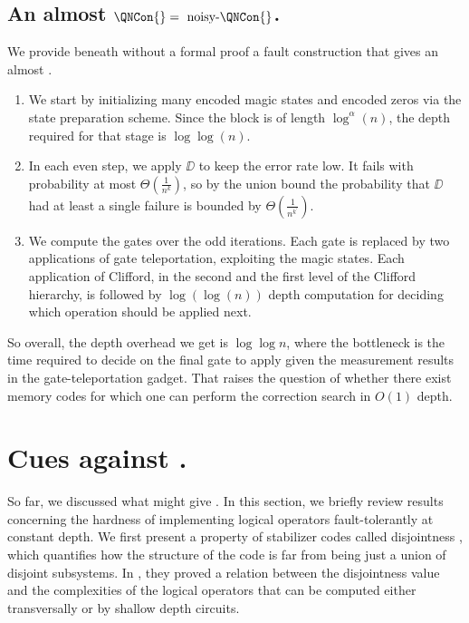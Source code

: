   \subsection{An almost $\QNCon{} = \text{ noisy-}\QNCon{} $.}
  We provide beneath without a formal proof a fault construction that gives an almost \CDO. 
  \begin{enumerate}
    \item We start by initializing many encoded magic states and encoded zeros via the state preparation scheme. Since the block is of length $\log^{\alpha}(n)$, the depth required for that stage is $\log\log(n)$.
    \item In each even step, we apply $\DD$ to keep the error rate low. It fails with probability at most $\Theta\left(\frac{1}{n^k}\right)$, so by the union bound the probability that $\DD$ had at least a single failure is bounded by $\Theta(\frac{1}{n^{k^{\prime}}})$.
    \item We compute the gates over the odd iterations. Each gate is replaced by two applications of gate teleportation, exploiting the magic states. Each application of Clifford, in the second and the first level of the Clifford hierarchy, is followed by $\log(\log (n))$ depth computation for deciding which operation should be applied next.
  \end{enumerate}
So overall, the depth overhead we get is $\log \log n$, where the bottleneck is the time required to decide on the final gate to apply given the measurement results in the gate-teleportation gadget. That raises the question of whether there exist memory codes for which one can perform the correction search in $O(1)$ depth. \cite{Gu_2024}

  \section{ Cues against \CDO.  }\label{sec:passi}
So far, we discussed what might give \CDO. In this section, we briefly review results concerning the hardness of implementing logical operators fault-tolerantly at constant depth. 
We first present a property of stabilizer codes called disjointness \cite{Jochym_O_Connor_2018} \cite{bostanci2021findingdisjointnessstabilizercodes}, which quantifies how the structure of the code is far from being just a union of disjoint subsystems. In \cite{Jochym_O_Connor_2018}, they proved a relation between the disjointness value and the complexities of the logical operators that can be computed either transversally or by shallow depth circuits.


